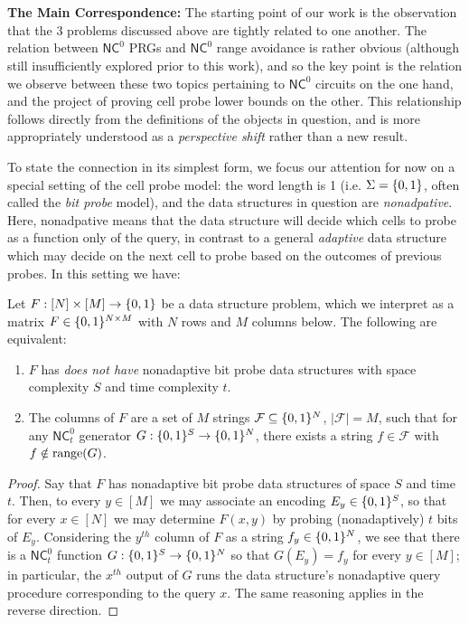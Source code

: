~\\~\\
{\bf \noindent The Main Correspondence:}
The starting point of our work is the observation that the 3 problems discussed above are tightly related to one another. The relation between $\mathsf{NC}^0$ PRGs and $\mathsf{NC}^0$ range avoidance is rather obvious (although still insufficiently explored prior to this work), and so the key point is the relation we observe between these two topics pertaining to $\mathsf{NC}^0$ circuits on the one hand, and the project of proving cell probe lower bounds on the other. This relationship follows directly from the definitions of the objects in question, and is more appropriately understood as a \emph{perspective shift} rather than a new result. 

To state the connection in its simplest form, we focus our attention for now on a special setting of the cell probe model: the word length is 1 (i.e. $\Sigma = \{0,1\}$, often called the \emph{bit probe} model), and the data structures in question are \emph{nonadpative}. Here, nonadpative means that the data structure will decide which cells to probe as a function only of the query, in contrast to a general \emph{adaptive} data structure which may decide on the next cell to probe based on the outcomes of previous probes. In this setting we have:
\begin{observation*}
Let $F: [N] \times [M] \to \{0,1\}$ be a data structure problem, which we interpret as a matrix $F \in \{0,1\}^{N \times M}$ with $N$ rows and $M$ columns below. The following are equivalent:
\begin{enumerate}
    \item $F$ has \emph{does not have} nonadaptive bit probe data structures with space complexity $S$ and time complexity $t$.
    \item The columns of $F$ are a set of $M$ strings $\mathcal{F} \subseteq \{0,1\}^N$, $|\mathcal{F}|=M$, such that for any $\mathsf{NC}^0_t$ generator $G: \{0,1\}^S \to \{0,1\}^N$, there exists a string $f \in \mathcal{F}$ with $f \notin \mathrm{range}(G)$.
\end{enumerate}
\end{observation*}
\begin{proof}
Say that $F$ has nonadaptive bit probe data structures of space $S$ and time $t$. Then, to every $y \in [M]$ we may associate an encoding $E_y \in \{0,1\}^S$, so that for every $x \in [N]$ we may determine $F(x,y)$ by probing (nonadaptively) $t$ bits of $E_y$. Considering the $y^{th}$ column of $F$ as a string $f_y\in \{0,1\}^N$, we see that there is a $\mathsf{NC}^0_t$ function $G: \{0,1\}^S \to \{0,1\}^N$ so that $G(E_y) = f_y$ for every $y\in [M]$; in particular, the $x^{th}$ output of $G$ runs the data structure's nonadaptive query procedure corresponding to the query $x$. The same reasoning applies in the reverse direction.
\end{proof}

